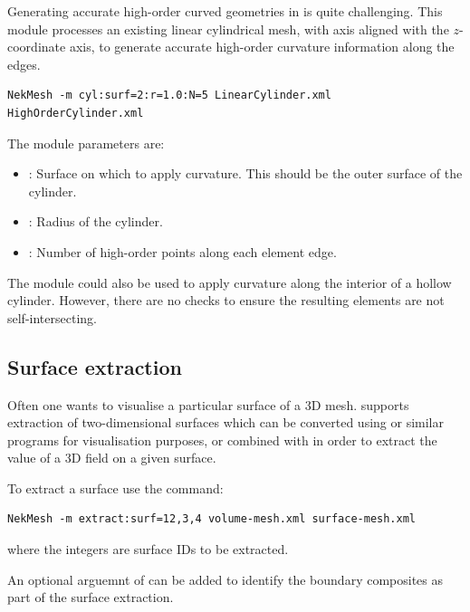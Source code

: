 Generating accurate high-order curved geometries in \gmsh is quite challenging.
This module processes an existing linear cylindrical mesh, with axis aligned
with the $z$-coordinate axis, to generate accurate high-order curvature
information along the edges.

\begin{lstlisting}[style=BashInputStyle]
NekMesh -m cyl:surf=2:r=1.0:N=5 LinearCylinder.xml HighOrderCylinder.xml
\end{lstlisting}

The module parameters are:

\begin{itemize}
  \item {}: Surface on which to apply curvature. This should be the
  outer surface of the cylinder.
  \item {}: Radius of the cylinder.
  \item {}: Number of high-order points along each element edge.
\end{itemize}

\begin{notebox}
  The module could also be used to apply curvature along the interior of a
  hollow cylinder. However, there are no checks to ensure the resulting elements
  are not self-intersecting.
\end{notebox}

\subsection{Surface extraction}

Often one wants to visualise a particular surface of a 3D mesh. \mc supports
extraction of two-dimensional surfaces which can be converted using
 or similar programs for visualisation purposes, or combined
with  in order to extract the value of a 3D field on a given
surface.

To extract a surface use the command:

\begin{lstlisting}[style=BashInputStyle]
  NekMesh -m extract:surf=12,3,4 volume-mesh.xml surface-mesh.xml
\end{lstlisting}

where the integers are surface IDs to be extracted.

An optional arguemnt of  can be added to identify the boundary composites as part of the surface extraction.

